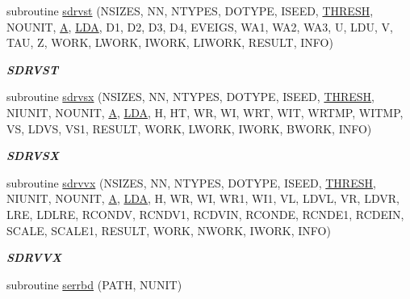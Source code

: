 \begin{DoxyCompactItemize}
subroutine \hyperlink{group__single__eig_ga4965dd452a2ac5ea65814add61ac0113}{sdrvst} (N\+S\+I\+Z\+E\+S, N\+N, N\+T\+Y\+P\+E\+S, D\+O\+T\+Y\+P\+E, I\+S\+E\+E\+D, \hyperlink{zlaqgs_8c_a0656018abfc9fa2821827415f5d5ea57}{T\+H\+R\+E\+S\+H}, N\+O\+U\+N\+I\+T, \hyperlink{classA}{A}, \hyperlink{example__user_8c_ae946da542ce0db94dced19b2ecefd1aa}{L\+D\+A}, D1, D2, D3, D4, E\+V\+E\+I\+G\+S, W\+A1, W\+A2, W\+A3, U, L\+D\+U, V, T\+A\+U, Z, W\+O\+R\+K, L\+W\+O\+R\+K, I\+W\+O\+R\+K, L\+I\+W\+O\+R\+K, R\+E\+S\+U\+L\+T, I\+N\+F\+O)
\begin{DoxyCompactList}\small\item\em {\bfseries S\+D\+R\+V\+S\+T} \end{DoxyCompactList}\item 
subroutine \hyperlink{group__single__eig_ga411333994f433776dd07049fe3973a66}{sdrvsx} (N\+S\+I\+Z\+E\+S, N\+N, N\+T\+Y\+P\+E\+S, D\+O\+T\+Y\+P\+E, I\+S\+E\+E\+D, \hyperlink{zlaqgs_8c_a0656018abfc9fa2821827415f5d5ea57}{T\+H\+R\+E\+S\+H}, N\+I\+U\+N\+I\+T, N\+O\+U\+N\+I\+T, \hyperlink{classA}{A}, \hyperlink{example__user_8c_ae946da542ce0db94dced19b2ecefd1aa}{L\+D\+A}, H, H\+T, W\+R, W\+I, W\+R\+T, W\+I\+T, W\+R\+T\+M\+P, W\+I\+T\+M\+P, V\+S, L\+D\+V\+S, V\+S1, R\+E\+S\+U\+L\+T, W\+O\+R\+K, L\+W\+O\+R\+K, I\+W\+O\+R\+K, B\+W\+O\+R\+K, I\+N\+F\+O)
\begin{DoxyCompactList}\small\item\em {\bfseries S\+D\+R\+V\+S\+X} \end{DoxyCompactList}\item 
subroutine \hyperlink{group__single__eig_ga91d3493bce6a97430fded1ad19b1bead}{sdrvvx} (N\+S\+I\+Z\+E\+S, N\+N, N\+T\+Y\+P\+E\+S, D\+O\+T\+Y\+P\+E, I\+S\+E\+E\+D, \hyperlink{zlaqgs_8c_a0656018abfc9fa2821827415f5d5ea57}{T\+H\+R\+E\+S\+H}, N\+I\+U\+N\+I\+T, N\+O\+U\+N\+I\+T, \hyperlink{classA}{A}, \hyperlink{example__user_8c_ae946da542ce0db94dced19b2ecefd1aa}{L\+D\+A}, H, W\+R, W\+I, W\+R1, W\+I1, V\+L, L\+D\+V\+L, V\+R, L\+D\+V\+R, L\+R\+E, L\+D\+L\+R\+E, R\+C\+O\+N\+D\+V, R\+C\+N\+D\+V1, R\+C\+D\+V\+I\+N, R\+C\+O\+N\+D\+E, R\+C\+N\+D\+E1, R\+C\+D\+E\+I\+N, S\+C\+A\+L\+E, S\+C\+A\+L\+E1, R\+E\+S\+U\+L\+T, W\+O\+R\+K, N\+W\+O\+R\+K, I\+W\+O\+R\+K, I\+N\+F\+O)
\begin{DoxyCompactList}\small\item\em {\bfseries S\+D\+R\+V\+V\+X} \end{DoxyCompactList}\item 
subroutine \hyperlink{group__single__eig_gaa15f9b7d5c1bd62dd1688a853242f973}{serrbd} (P\+A\+T\+H, N\+U\+N\+I\+T)

\end{DoxyCompactItemize}
